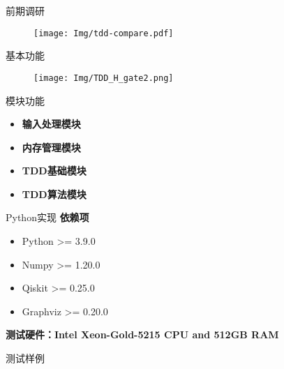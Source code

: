 \documentclass[aspectratio=1610]{beamer}
\begin{document}
\begin{frame}{前期调研}
    \begin{figure}
        \centering
        \texttt{[image: Img/tdd-compare.pdf]}
    \end{figure}
\end{frame}
\begin{frame}{基本功能}
    \begin{figure}
        \centering
        \texttt{[image: Img/TDD\_H\_gate2.png]}
    \end{figure}
\end{frame}
\begin{frame}{模块功能}
        \begin{itemize}
            \item \textbf{输入处理模块}
            \item \textbf{内存管理模块}
            \item \textbf{TDD基础模块}
            \item \textbf{TDD算法模块}
        \end{itemize}
\end{frame}
\begin{frame}{Python实现}
    \textbf{依赖项}
    \begin{itemize}
        \item Python >= 3.9.0
        \item Numpy >= 1.20.0
        \item Qiskit >= 0.25.0
        \item Graphviz >= 0.20.0
    \end{itemize}
    \textbf{测试硬件：Intel Xeon-Gold-5215 CPU and 512GB RAM}
\end{frame}
\begin{frame}{测试样例}
    \begin{table}[]
    \end{table}
\end{frame}
\end{document}
